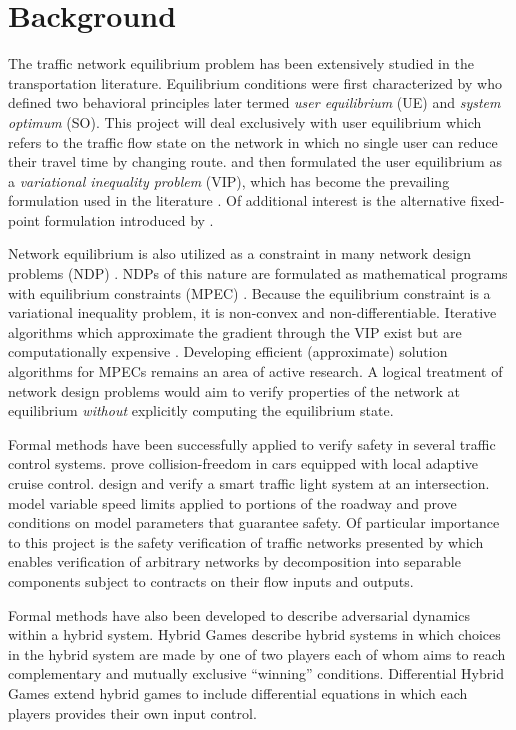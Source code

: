 \section{Background}

The traffic network equilibrium problem has been extensively studied in the transportation literature. Equilibrium conditions were first characterized by \citet{wardrop1952some} who defined two behavioral principles later termed \textit{user equilibrium} (UE) and \textit{system optimum} (SO). This project will deal exclusively with user equilibrium which refers to the traffic flow state on the network in which no single user can reduce their travel time by changing route. \citet{smith1979existence} and \citet{dafermos1980traffic} then formulated the user equilibrium as a \textit{variational inequality problem} (VIP), which has become the prevailing formulation used in the literature \citep{nagurney2009netecon}. Of additional interest is the alternative fixed-point formulation introduced by \citet{smith1979existence}.

Network equilibrium is also utilized as a constraint in many network design problems (NDP) \citep{sheffi1983optimal}. NDPs of this nature are formulated as mathematical programs with equilibrium  constraints (MPEC) \citep{luo1996mathematical}. Because the equilibrium constraint is a variational inequality problem, it is non-convex and non-differentiable. Iterative algorithms which approximate the gradient through the VIP exist but are computationally expensive \citep{josefsson2007sensitivity}. Developing efficient (approximate) solution algorithms for MPECs remains an area of active research. A logical treatment of network design problems would aim to verify properties of the network at equilibrium \textit{without} explicitly computing the equilibrium state. 

Formal methods have been successfully applied to verify safety in several traffic control systems. \citet{DBLP:conf/fm/LoosPN11} prove collision-freedom in cars equipped with local adaptive cruise control. \citet{DBLP:conf/itsc/LoosP11} design and verify a smart traffic light system at an intersection.  \citet{DBLP:conf/iccps/MitschLP12} model variable speed limits applied to portions of the roadway and prove conditions on model parameters that guarantee safety. Of particular importance to this project is the safety verification of traffic networks presented by \citet{DBLP:conf/itsc/MullerMP15} which enables verification of arbitrary networks by decomposition into separable components subject to contracts on their flow inputs and outputs. 

Formal methods have also been developed to describe adversarial dynamics within a hybrid system. Hybrid Games \citep{Platzer13:dGL} describe hybrid systems in which choices in the hybrid system are made by one of two players each of whom aims to reach complementary and mutually exclusive ``winning'' conditions. Differential Hybrid Games \citep{DBLP:journals/tocl/Platzer17} extend hybrid games to include differential equations in which each players provides their own input control.